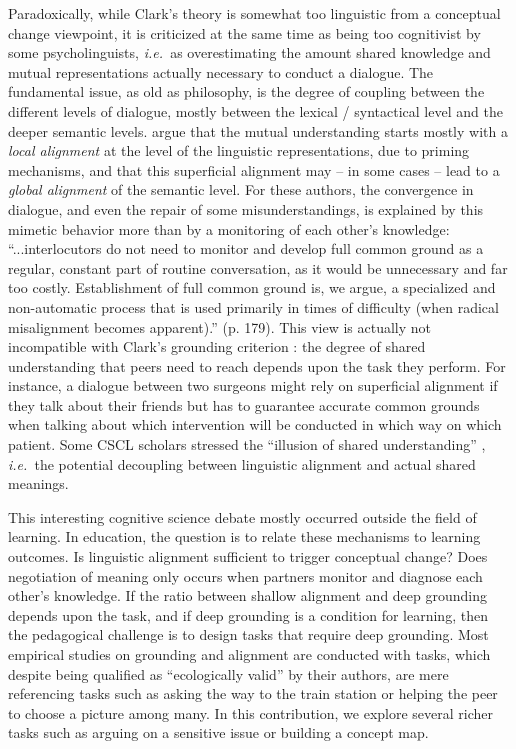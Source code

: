 \documentclass[twocolumn]{article}
\newcommand{\ie}{{\textit{i.e.\ }}}
\begin{document}
Paradoxically, while Clark's theory is somewhat too linguistic from a conceptual
change viewpoint, it is criticized at the same time as being too cognitivist by
some psycholinguists, \ie as overestimating the amount shared knowledge and
mutual representations actually necessary to conduct a dialogue. The fundamental
issue, as old as philosophy, is the degree of coupling between the different
levels of dialogue, mostly between the lexical / syntactical level and the
deeper semantic levels. \citet{pickering2006alignment} argue that the mutual
understanding starts mostly with a \emph{local alignment} at the level of the
linguistic representations, due to priming mechanisms, and that this superficial
alignment may -- in some cases -- lead to a \emph{global alignment} of the
semantic level.  For these authors, the convergence in dialogue, and even the
repair of some misunderstandings, is explained by this mimetic behavior more
than by a monitoring of each other's knowledge: ``...interlocutors do not need
to monitor and develop full common ground as a regular, constant part of routine
conversation, as it would be unnecessary and far too costly. Establishment of
full common ground is, we argue, a specialized and non-automatic process that is
used primarily in times of difficulty (when radical misalignment becomes
apparent).'' (p. 179). This view is actually not incompatible with Clark's
grounding criterion : the degree of shared understanding that peers
need to reach depends upon the task they perform. For instance, a dialogue
between two surgeons might rely on superficial alignment if they talk about
their friends but has to guarantee accurate common grounds when talking about
which intervention will be conducted in which way on which patient.  Some CSCL
scholars stressed the ``illusion of shared understanding'' ,
\ie the potential decoupling between linguistic alignment and actual shared
meanings.

This interesting cognitive science debate mostly occurred outside the field of
learning. In education, the question is to relate these mechanisms to learning
outcomes. Is linguistic alignment sufficient to trigger conceptual change? Does
negotiation of meaning only occurs when partners monitor and diagnose each
other's knowledge. If the ratio between shallow alignment and deep grounding
depends upon the task, and if deep grounding is a condition for learning, then
the pedagogical challenge is to design tasks that require deep grounding. Most
empirical studies on grounding and alignment are conducted with tasks, which
despite being qualified as ``ecologically valid'' by their authors, are mere
referencing tasks such as asking the way to the train station or helping the
peer to choose a picture among many. In this contribution, we explore several
richer tasks such as arguing on a sensitive issue or building a concept map.  
\end{document}
